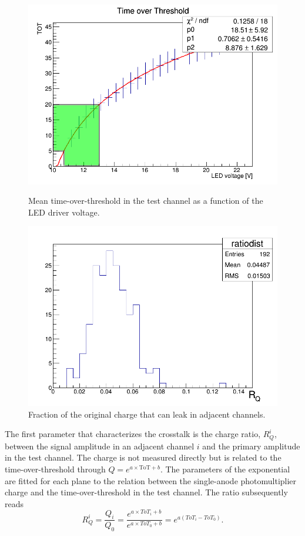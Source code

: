 \documentclass[a4paper,11pt]{article}
\begin{document}
\begin{figure}[htr!]
  \begin{minipage}[b]{.49\textwidth}
   \centering
   \includegraphics[width=\textwidth]{settings.png}
   \caption{Mean time-over-threshold in the test channel as a function of the LED driver voltage.}
   \label{fig:voltage}
  \end{minipage}
  \begin{minipage}[b]{.49\textwidth}
   \centering
   \includegraphics[width=\textwidth]{ratiodist.png}
   \caption{Fraction of the original charge that can leak in adjacent channels.}
   \label{fig:ratio_dist}
  \end{minipage}
\end{figure}


The first parameter that characterizes the crosstalk is the charge ratio, $R_Q^i$, between the signal amplitude in an adjacent channel $i$ and the primary amplitude in the test channel. The charge is not measured directly but is related to the time-over-threshold through $Q=e^{a\times \mathrm{ToT}+b}$. The parameters of the exponential are fitted for each plane to the relation between the single-anode photomultiplier charge and the time-over-threshold in the test channel. The ratio subsequently reads
\begin{equation}
R_Q^i=\frac{Q_i}{Q_0}=\frac{e^{a\times ToT_i+b}}{e^{a\times ToT_0+b}}=e^{a(ToT_i-ToT_0)}.
\end{equation}
\end{document}
